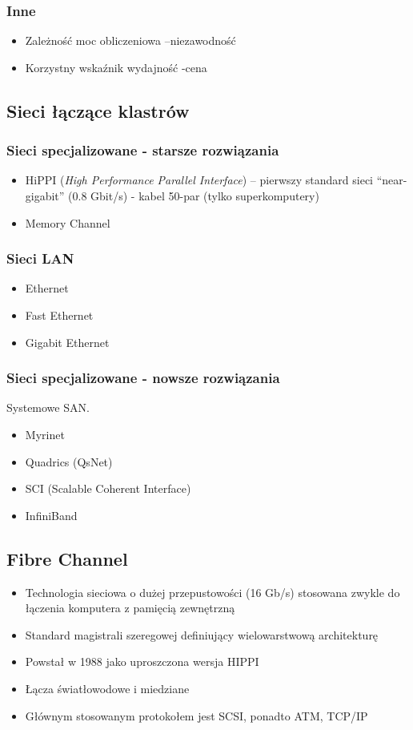 \documentclass[a4paper,twoside]{article}
\begin{document}
\subsubsection{Inne}
\begin{itemize}
	\item Zależność moc obliczeniowa –niezawodność
	\item Korzystny wskaźnik wydajność -cena
\end{itemize}
\subsection{Sieci łączące klastrów}
\subsubsection{Sieci specjalizowane - starsze rozwiązania}
\begin{itemize}
	\item HiPPI (\emph{High Performance Parallel Interface}) – pierwszy standard sieci “near-gigabit” (0.8 Gbit/s) - kabel 50-par (tylko superkomputery)
	\item Memory Channel
\end{itemize}
\subsubsection{Sieci LAN}
\begin{itemize}
	\item Ethernet
	\item Fast Ethernet
	\item Gigabit Ethernet
\end{itemize}
\subsubsection{Sieci specjalizowane - nowsze rozwiązania}
Systemowe SAN.
\begin{itemize}
	\item Myrinet
	\item Quadrics (QsNet)
	\item SCI (Scalable Coherent Interface)
	\item InfiniBand
\end{itemize}
\subsection{Fibre Channel}
\begin{itemize}
	\item Technologia sieciowa o dużej przepustowości (16 Gb/s) stosowana zwykle do łączenia komputera z pamięcią zewnętrzną
	\item Standard magistrali szeregowej definiujący wielowarstwową architekturę
	\item Powstał w 1988 jako uproszczona wersja HIPPI
	\item Łącza światłowodowe i miedziane
	\item Głównym stosowanym protokołem jest SCSI, ponadto ATM, TCP/IP
\end{itemize}
\end{document}
